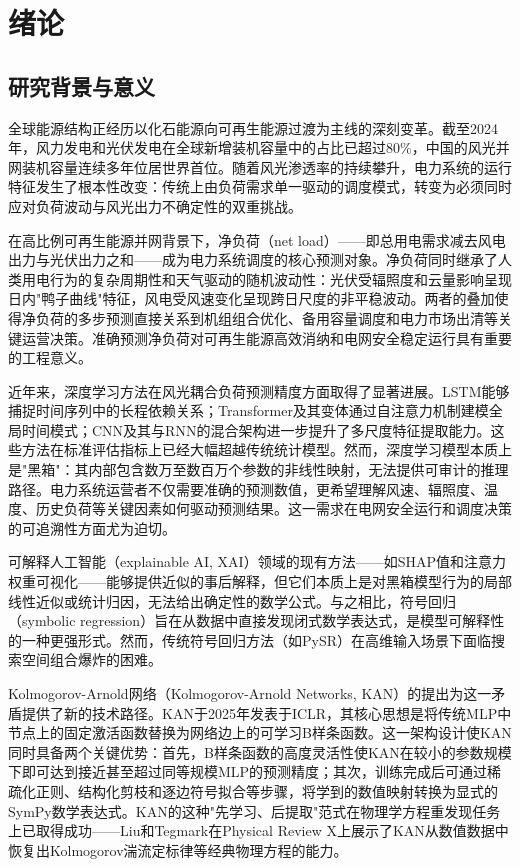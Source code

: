\chapter{绪论}

\section{研究背景与意义}

全球能源结构正经历以化石能源向可再生能源过渡为主线的深刻变革。截至2024年，风力发电和光伏发电在全球新增装机容量中的占比已超过80\%，中国的风光并网装机容量连续多年位居世界首位。随着风光渗透率的持续攀升，电力系统的运行特征发生了根本性改变：传统上由负荷需求单一驱动的调度模式，转变为必须同时应对负荷波动与风光出力不确定性的双重挑战\cite{hong2016probabilistic,kaur2016net}。

在高比例可再生能源并网背景下，净负荷（net load）——即总用电需求减去风电出力与光伏出力之和——成为电力系统调度的核心预测对象。净负荷同时继承了人类用电行为的复杂周期性和天气驱动的随机波动性：光伏受辐照度和云量影响呈现日内"鸭子曲线"特征，风电受风速变化呈现跨日尺度的非平稳波动\cite{hanifi2020critical,inman2013solar}。两者的叠加使得净负荷的多步预测直接关系到机组组合优化、备用容量调度和电力市场出清等关键运营决策。准确预测净负荷对可再生能源高效消纳和电网安全稳定运行具有重要的工程意义\cite{kaur2016net}。

近年来，深度学习方法在风光耦合负荷预测精度方面取得了显著进展。LSTM能够捕捉时间序列中的长程依赖关系\cite{silva2024lstm}；Transformer及其变体通过自注意力机制建模全局时间模式\cite{ebrahimzadeh2024ai}；CNN及其与RNN的混合架构进一步提升了多尺度特征提取能力\cite{wang2023hybrid}。这些方法在标准评估指标上已经大幅超越传统统计模型。然而，深度学习模型本质上是"黑箱"：其内部包含数万至数百万个参数的非线性映射，无法提供可审计的推理路径。电力系统运营者不仅需要准确的预测数值，更希望理解风速、辐照度、温度、历史负荷等关键因素如何驱动预测结果。这一需求在电网安全运行和调度决策的可追溯性方面尤为迫切。

可解释人工智能（explainable AI, XAI）领域的现有方法——如SHAP值和注意力权重可视化——能够提供近似的事后解释，但它们本质上是对黑箱模型行为的局部线性近似或统计归因，无法给出确定性的数学公式\cite{machlev2022explainable}。与之相比，符号回归（symbolic regression）旨在从数据中直接发现闭式数学表达式，是模型可解释性的一种更强形式。然而，传统符号回归方法（如PySR\cite{cranmer2023pysr}）在高维输入场景下面临搜索空间组合爆炸的困难。

Kolmogorov-Arnold网络（Kolmogorov-Arnold Networks, KAN）的提出为这一矛盾提供了新的技术路径。KAN于2025年发表于ICLR\cite{liu2025kan}，其核心思想是将传统MLP中节点上的固定激活函数替换为网络边上的可学习B样条函数。这一架构设计使KAN同时具备两个关键优势：首先，B样条函数的高度灵活性使KAN在较小的参数规模下即可达到接近甚至超过同等规模MLP的预测精度；其次，训练完成后可通过稀疏化正则、结构化剪枝和逐边符号拟合等步骤，将学到的数值映射转换为显式的SymPy数学表达式\cite{liu2025kan,liu2025kan2}。KAN的这种"先学习、后提取"范式在物理学方程重发现任务上已取得成功——Liu和Tegmark\cite{liu2025kan2}在Physical Review X上展示了KAN从数值数据中恢复出Kolmogorov湍流定标律等经典物理方程的能力。

